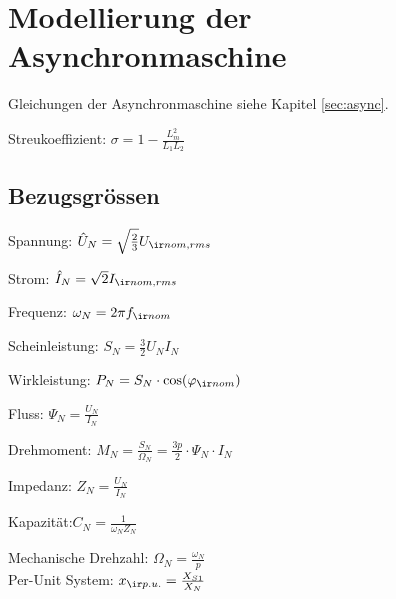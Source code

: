 \documentclass[fs, german]{latex4ei_fs}
\begin{document}
\section{Modellierung der Asynchronmaschine}

\begin{sectionbox}
Gleichungen der Asynchronmaschine siehe Kapitel \ref{sec:async}.

Streukoeffizient: $\sigma = 1 - \frac{L_m^2}{L_1 L_2}$
\end{sectionbox}

\begin{sectionbox}
\subsection{Bezugsgrössen}

Spannung: $\hat U_N = \sqrt{\frac{2}{3}} U_{\ir nom, rms} $


Strom: $\hat I_N = \sqrt 2 I_{\ir nom, rms}$

Frequenz: $\omega_N = 2\pi f_{\ir nom}$

Scheinleistung: $S_N = \frac{3}{2} U_N I_N$

Wirkleistung: $P_N = S_N \cdot \cos(\varphi_{\ir nom})$

Fluss: $\Psi_N = \frac{U_N}{I_N}$

Drehmoment: $M_N = \frac{S_N}{\Omega_N} = \frac{3 p }{2} \cdot \Psi_N \cdot I_N$

Impedanz: $Z_N = \frac{U_N}{I_N}$

Kapazität:$ C_N = \frac{1}{\omega_N Z_N}$

Mechanische Drehzahl: $\Omega_N = \frac{\omega_N}{p}$ \\

Per-Unit System:
$x_{\ir p.u.} = \frac{X_{S1}}{X_N}$
\end{sectionbox}
\end{document}
